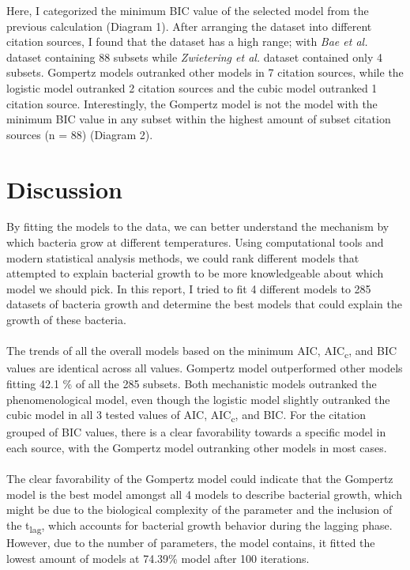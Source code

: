 \documentclass[11pt]{article}
\begin{document}
    Here, I categorized the minimum BIC value of the selected model from the previous calculation (Diagram 1). 
    After arranging the dataset into different citation sources, I found that the dataset has a high range; with \textit{Bae et al.} dataset containing 88 subsets while \textit{Zwietering et al.} dataset contained only 4 subsets.
    Gompertz models outranked other models in 7 citation sources, while the logistic model outranked 2 citation sources and the cubic model outranked 1 citation source.
    Interestingly, the Gompertz model is not the model with the minimum BIC value in any subset within the highest amount of subset citation sources (n = 88) (Diagram 2).


    \section{Discussion}
    By fitting the models to the data, we can better understand the mechanism by which bacteria grow at different temperatures.
    Using computational tools and modern statistical analysis methods, we could rank different models that attempted to explain bacterial growth to be more knowledgeable about which model we should pick.
    In this report, I tried to fit 4 different models to 285 datasets of bacteria growth and determine the best models that could explain the growth of these bacteria.
    \\
    \\
    The trends of all the overall models based on the minimum AIC, AIC\textsubscript{c}, and BIC values are identical across all values.
    Gompertz model outperformed other models fitting 42.1 \% of all the 285 subsets. 
    Both mechanistic models outranked the phenomenological model, even though the logistic model slightly outranked the cubic model in all 3 tested values of AIC, AIC\textsubscript{c}, and BIC.
    For the citation grouped of BIC values, there is a clear favorability towards a specific model in each source, with the Gompertz model outranking other models in most cases. 
    \\
    \\
    The clear favorability of the Gompertz model could indicate that the Gompertz model is the best model amongst all 4 models to describe bacterial growth, which might be due to the biological complexity of the parameter and the inclusion of the t\textsubscript{lag}, which accounts for bacterial growth behavior during the lagging phase.
    However, due to the number of parameters, the model contains, it fitted the lowest amount of models at 74.39\% model after 100 iterations.
\end{document}
